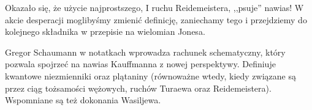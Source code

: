 Okazało się, że użycie najprostszego, I ruchu Reidemeistera, ,,psuje'' nawias!
W akcie desperacji moglibyśmy zmienić definicję,
zaniechamy tego i przejdziemy do kolejnego składnika w przepisie na wielomian Jonesa.

Gregor Schaumann w notatkach \cite{schaumann16} wprowadza rachunek schematyczny,
który pozwala spojrzeć na nawias Kauffmanna z nowej perspektywy.
Definiuje kwantowe niezmienniki oraz plątaniny (równoważne wtedy,
kiedy związane są przez ciąg tożsamości wężowych, ruchów Turaewa oraz Reidemeistera).
Wspomniane są też dokonania Wasiljewa.

